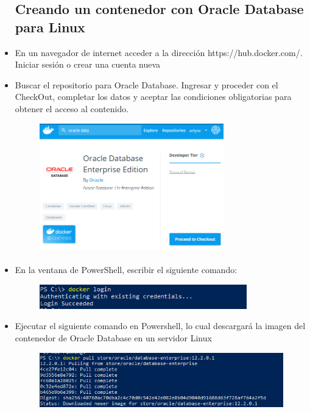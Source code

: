 \begin{itemize}
\subsection{ Creando un contenedor con Oracle Database para Linux}
	\item En un navegador de internet acceder a la dirección https://hub.docker.com/. Iniciar sesión o crear una cuenta nueva
	\item Buscar el repositorio para Oracle Database. Ingresar y proceder con el CheckOut, completar los datos y aceptar las condiciones obligatorias para obtener el acceso al contenido.
		\begin{figure}[H]
		\begin{center}
		\includegraphics[width=8cm]{./Imagenes/3}
		\end{center}
		\end{figure}
	\item En la ventana de PowerShell, escribir el siguiente comando:
		\begin{figure}[H]
		\begin{center}
		\includegraphics[width=9cm]{./Imagenes/4}
		\end{center}
		\end{figure}
	\item Ejecutar el siguiente comando en Powershell, lo cual descargará la imagen del contenedor de Oracle Database en un servidor Linux
		\begin{figure}[H]
		\begin{center}
		\includegraphics[width=15cm]{./Imagenes/5}

\end{center}
\end{figure}
\end{itemize}

